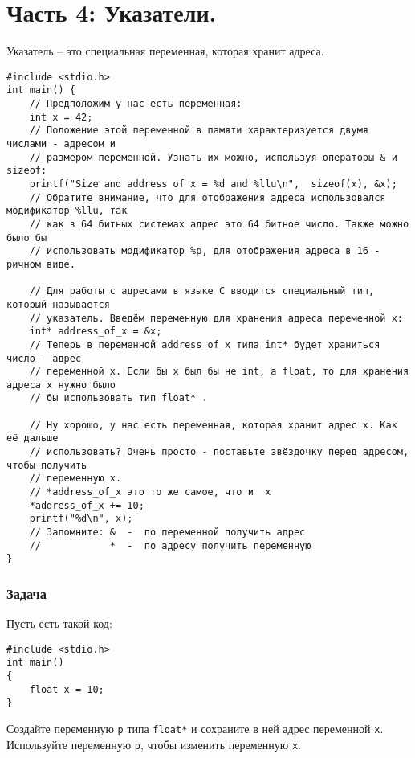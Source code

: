 \documentclass{article}
\begin{document}
\section*{Часть 4: Указатели.}
Указатель -- это специальная переменная, которая хранит адреса.
\begin{lstlisting}
#include <stdio.h>
int main() { 
    // Предположим у нас есть переменная:
    int x = 42; 
    // Положение этой переменной в памяти характеризуется двумя числами - адресом и 
    // размером переменной. Узнать их можно, используя операторы & и sizeof:
    printf("Size and address of x = %d and %llu\n",  sizeof(x), &x);
    // Обратите внимание, что для отображения адреса использовался модификатор %llu, так 
    // как в 64 битных системах адрес это 64 битное число. Также можно было бы 
    // использовать модификатор %p, для отображения адреса в 16 - ричном виде.
    
    // Для работы с адресами в языке C вводится специальный тип, который называется 
    // указатель. Введём переменную для хранения адреса переменной x:
    int* address_of_x = &x;
    // Теперь в переменной address_of_x типа int* будет храниться число - адрес 
    // переменной x. Если бы x был бы не int, а float, то для хранения адреса x нужно было 
    // бы использовать тип float* .
    
    // Ну хорошо, у нас есть переменная, которая хранит адрес x. Как её дальше 
    // использовать? Очень просто - поставьте звёздочку перед адресом, чтобы получить 
    // переменную x.
    // *address_of_x это то же самое, что и  x
    *address_of_x += 10;
    printf("%d\n", x);
    // Запомните: &  -  по переменной получить адрес
    //            *  -  по адресу получить переменную
} 
\end{lstlisting}

\subsubsection*{Задача}
Пусть есть такой код:
\begin{lstlisting}
#include <stdio.h>
int main() 
{ 
    float x = 10;
} 
\end{lstlisting}
Создайте переменную \texttt{p} типа \texttt{float*} и сохраните в ней адрес переменной \texttt{x}. Используйте переменную \texttt{p}, чтобы изменить переменную \texttt{x}.
\end{document}
